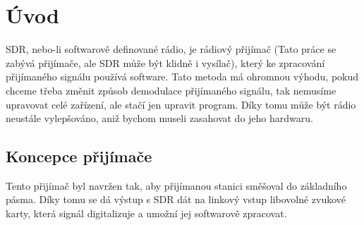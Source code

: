 \section{Úvod}
	SDR, nebo-li softwarově definované rádio, je rádiový přijímač (Tato práce se zabývá přijímače, ale SDR může být klidně i vysílač), který ke zpracování přijímaného signálu používá software. Tato metoda má ohromnou výhodu, pokud chceme třeba změnit způsob demodulace přijímaného signálu, tak nemusíme upravovat celé zařízení, ale stačí jen upravit program. Díky tomu může být rádio neustále vylepšováno, aniž bychom museli zasahovat do jeho hardwaru.
	
	\subsection{Koncepce přijímače}
		Tento přijímač byl navržen tak, aby přijímanou stanici směšoval do základního pásma. Díky tomu se dá výstup s SDR dát na linkový vstup libovolné zvukové karty, která signál digitalizuje a umožní jej softwarově zpracovat.
		
	
  		
  		